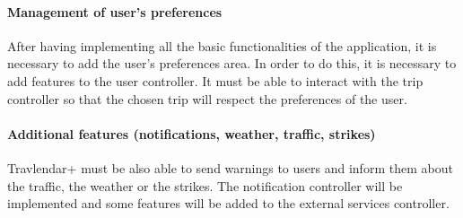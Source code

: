 \documentclass[12pt,titlepage]{article}
\begin{document}
\paragraph{Management of user's preferences}
After having implementing all the basic functionalities of the application, it is necessary to add the user's preferences area. In order to do this, it is necessary to add features to the user controller. It must be able to interact with the trip controller so that the chosen trip will respect the preferences of the user.
\begin{figure}[H]
\centering
{}
\end{figure}
\paragraph{Additional features (notifications, weather, traffic, strikes)}
Travlendar+ must be also able to send warnings to users and inform them about the traffic, the weather or the strikes. The notification controller will be implemented and some features will be added to the external services controller.
\begin{figure}[H]
\centering
{}
\end{figure}
\end{document}
